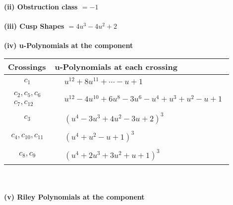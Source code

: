 \documentclass[1p]{elsarticle_modified}
\theoremstyle{definition}
\begin{document}
\flushleft \textbf{(ii) Obstruction class $= -1$}\\~\\
\flushleft \textbf{(iii) Cusp Shapes $= 4 u^3-4 u^2+2$}\\~\\
\newpage\renewcommand{\arraystretch}{1}
\flushleft \textbf{(iv) u-Polynomials at the component}\newline \\
\begin{tabular}{m{50pt}|m{274pt}}
Crossings & \hspace{64pt}u-Polynomials at each crossing \\
\hline $$\begin{aligned}c_{1}\end{aligned}$$&$\begin{aligned}
&u^{12}+8 u^{11}+\cdots- u+1
\end{aligned}$\\
\hline $$\begin{aligned}c_{2},c_{5},c_{6}\\c_{7},c_{12}\end{aligned}$$&$\begin{aligned}
&u^{12}-4 u^{10}+6 u^8-3 u^6- u^4+u^3+u^2- u+1
\end{aligned}$\\
\hline $$\begin{aligned}c_{3}\end{aligned}$$&$\begin{aligned}
&(u^4-3 u^3+4 u^2-3 u+2)^3
\end{aligned}$\\
\hline $$\begin{aligned}c_{4},c_{10},c_{11}\end{aligned}$$&$\begin{aligned}
&(u^4+u^2- u+1)^3
\end{aligned}$\\
\hline $$\begin{aligned}c_{8},c_{9}\end{aligned}$$&$\begin{aligned}
&(u^4+2 u^3+3 u^2+u+1)^3
\end{aligned}$\\
\hline
\end{tabular}\\~\\
\newpage\renewcommand{\arraystretch}{1}
\flushleft \textbf{(v) Riley Polynomials at the component}\newline \\
\end{document}
